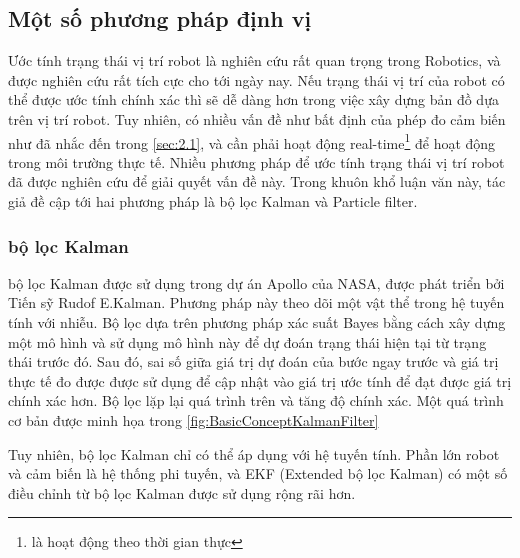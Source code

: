 {{%


\subsection{Một số phương pháp định vị}

Ước tính trạng thái vị trí robot là nghiên cứu rất quan trọng trong Robotics, và được nghiên cứu rất tích cực cho tới ngày nay. Nếu trạng thái vị trí của robot có thể được ước tính chính xác thì sẽ dễ dàng hơn trong việc xây dựng bản đồ dựa trên vị trí robot. Tuy nhiên, có nhiều vấn đề như bất định của phép đo cảm biến như đã nhắc đến trong \ref{sec:2.1}, và cần phải hoạt động real-time\footnote{là hoạt động theo thời gian thực} để hoạt động trong môi trường thực tế. Nhiều phương pháp để ước tính trạng thái vị trí robot đã được nghiên cứu để giải quyết vấn đề này. Trong khuôn khổ luận văn này, tác giả đề cập tới hai phương pháp là bộ lọc Kalman và Particle filter.

\subsubsection*{bộ lọc Kalman}
bộ lọc Kalman được sử dụng trong dự án Apollo của NASA, được phát triển bởi Tiến sỹ Rudof E.Kalman. Phương pháp này theo dõi một vật thể trong hệ tuyến tính với nhiễu. Bộ lọc dựa trên phương pháp xác suất Bayes bằng cách xây dựng một mô hình và sử dụng mô hình này để dự đoán trạng thái hiện tại từ trạng thái trước đó. Sau đó, sai số giữa giá trị dự đoán của bước ngay trước và giá trị thực tế đo được được sử dụng để cập nhật vào giá trị ước tính để đạt được giá trị chính xác hơn. Bộ lọc lặp lại quá trình trên và tăng độ chính xác. Một quá trình cơ bản được minh họa trong \figurename{ \ref{fig:BasicConceptKalmanFilter}}

Tuy nhiên, bộ lọc Kalman chỉ có thể áp dụng với hệ tuyến tính. Phần lớn robot và cảm biến là hệ thống phi tuyến, và EKF (Extended bộ lọc Kalman) có một số điều chỉnh từ bộ lọc Kalman được sử dụng rộng rãi hơn.


}}
